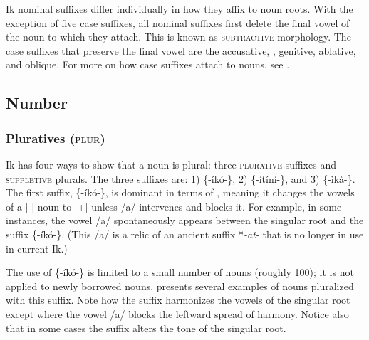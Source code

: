 Ik nominal suffixes differ individually in how they affix to noun roots. With the exception of five case suffixes, all nominal suffixes first delete the final vowel of the noun to which they attach. This is known as \textsc{subtractive} morphology. The case suffixes that preserve the final vowel are the accusative, , genitive, ablative, and oblique. For more on how case suffixes attach to nouns, see .




\subsection{Number}\label{sec:4.2}
\subsubsection{Pluratives (\textsc{plur})}\label{sec:4.2.1}

Ik has four ways to show that a noun is plural: three \textsc{plurative} suffixes and \textsc{suppletive} plurals. The three  suffixes are: 1) \{-íkó-\}, 2) \{-ítíní-\}, and 3) \{-ìkà-\}. The first  suffix, \{-íkó-\}, is dominant in terms of , meaning it changes the vowels of a [-] noun to [+] unless /a/ intervenes and blocks it. For example, in some instances, the vowel /a/ spontaneously appears between the singular root and the suffix \{-íkó-\}. (This /a/ is a relic of an ancient  suffix *\textit{{}-at-} that is no longer in use in current Ik.)

The use of \{-íkó-\} is limited to a small number of nouns (roughly 100); it is not applied to newly borrowed nouns.  presents several examples of nouns pluralized with this suffix. Note how the suffix harmonizes the vowels of the singular root except where the vowel /a/ blocks the leftward spread of harmony. Notice also that in some cases the suffix alters the tone of the singular root.


